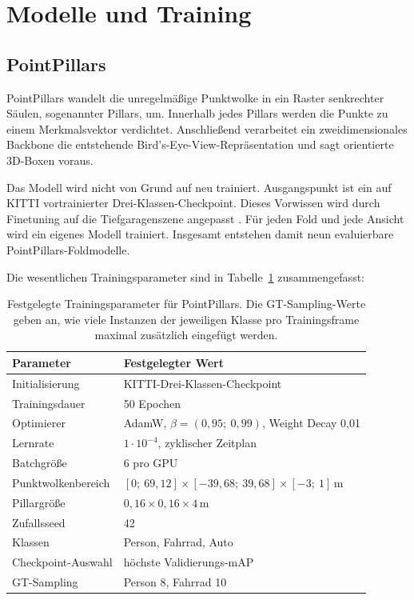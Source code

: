 \section{Modelle und Training}

\subsection{PointPillars}

PointPillars \cite{lang2019pointpillars} wandelt die unregelmäßige Punktwolke in ein Raster senkrechter Säulen, sogenannter Pillars, um. Innerhalb jedes Pillars werden die Punkte zu einem Merkmalsvektor verdichtet. Anschließend verarbeitet ein zweidimensionales Backbone die entstehende Bird's-Eye-View-Repräsentation und sagt orientierte 3D-Boxen voraus.

Das Modell wird nicht von Grund auf neu trainiert. Ausgangspunkt ist ein auf KITTI \cite{geiger2012kitti} vortrainierter Drei-Klassen-Checkpoint. Dieses Vorwissen wird durch Finetuning auf die Tiefgaragenszene angepasst \cite{pan2010transfer}. Für jeden Fold und jede Ansicht wird ein eigenes Modell trainiert. Insgesamt entstehen damit neun evaluierbare PointPillars-Foldmodelle.

Die wesentlichen Trainingsparameter sind in Tabelle~\ref{tab:training-params} zusammengefasst:

\begin{table}[H]
\centering
\begin{tabular}{ll}
\toprule
\textbf{Parameter} & \textbf{Festgelegter Wert} \\
\midrule
Initialisierung & KITTI-Drei-Klassen-Checkpoint \\
Trainingsdauer & 50 Epochen \\
Optimierer & AdamW, \(\beta = (0{,}95;\ 0{,}99)\), Weight Decay 0{,}01 \\
Lernrate & \(1 \cdot 10^{-4}\), zyklischer Zeitplan \\
Batchgröße & 6 pro GPU \\
Punktwolkenbereich & \([0;\ 69{,}12] \times [-39{,}68;\ 39{,}68] \times [-3;\ 1]\,\text{m}\) \\
Pillargröße & \(0{,}16 \times 0{,}16 \times 4\,\text{m}\) \\
Zufallsseed & 42 \\
Klassen & Person, Fahrrad, Auto \\
Checkpoint-Auswahl & höchste Validierungs-mAP \\
GT-Sampling & Person 8, Fahrrad 10 \\
\bottomrule
\end{tabular}
\caption{Festgelegte Trainingsparameter für PointPillars. Die GT-Sampling-Werte geben an, wie viele Instanzen der jeweiligen Klasse pro Trainingsframe maximal zusätzlich eingefügt werden.}
\label{tab:training-params}
\end{table}

